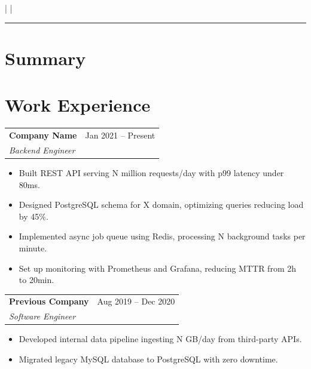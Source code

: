 \documentclass[10pt, a4paper]{article}
\makeatletter
\newcommand{\contactitem}[1]{\small #1}
\newcommand{\workentry}[4]{%
  \noindent
  \begin{tabularx}{\linewidth}{@{}X r@{}}
    \textbf{#1} & \textcolor{subtle}{\small #3} \\
    \textit{\small #2} &
  \end{tabularx}
  \vspace{1pt}
  #4
  \vspace{6pt}
}
\makeatother
\begin{document}

\begin{center}
  {\LARGE\bfseries\color{accent} \VarName}\\[4pt]
  {\small \VarRole}\\[6pt]
  \contactitem{\VarEmail}
  \quad\textcolor{subtle}{|}\quad
  \contactitem{\VarPhone}
  \quad\textcolor{subtle}{|}\quad
  \contactitem{\VarLocation}
\end{center}

\vspace{4pt}
\textcolor{accent}{\rule{\linewidth}{0.8pt}}
\vspace{6pt}

\section{Summary}
\VarSummary

\section{Work Experience}
\workentry{Company Name}{Backend Engineer}{Jan 2021 -- Present}{%
  \begin{itemize}
    \item Built REST API serving N million requests/day with p99 latency under 80ms.
    \item Designed PostgreSQL schema for X domain, optimizing queries reducing load by 45\%.
    \item Implemented async job queue using Redis, processing N background tasks per minute.
    \item Set up monitoring with Prometheus and Grafana, reducing MTTR from 2h to 20min.
  \end{itemize}
}

\workentry{Previous Company}{Software Engineer}{Aug 2019 -- Dec 2020}{%
  \begin{itemize}
    \item Developed internal data pipeline ingesting N GB/day from third-party APIs.
    \item Migrated legacy MySQL database to PostgreSQL with zero downtime.
  \end{itemize}
}
\end{document}
